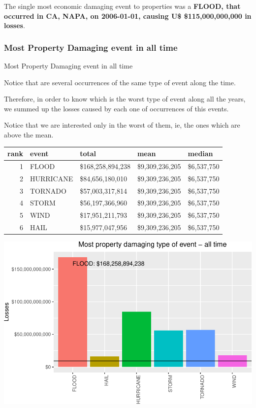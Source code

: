 \documentclass[]{article}
\begin{document}
The single most economic damaging event to properties was a
\textbf{FLOOD, that occurred in CA, NAPA, on 2006-01-01, causing U\$
\$115,000,000,000 in losses}.

\subsubsection{Most Property Damaging event in all
time}\label{most-property-damaging-event-in-all-time}

Most Property Damaging event in all time

Notice that are several occurrences of the same type of event along the
time.

Therefore, in order to know which is the worst type of event along all
the years, we summed up the losses caused by each one of occurrences of
this events.

Notice that we are interested only in the worst of them, ie, the ones
which are above the mean.

\begin{longtable}[]{@{}rllll@{}}
\toprule
rank & event & total & mean & median\tabularnewline
\midrule
\endhead
1 & FLOOD & \$168,258,894,238 & \$9,309,236,205 &
\$6,537,750\tabularnewline
2 & HURRICANE & \$84,656,180,010 & \$9,309,236,205 &
\$6,537,750\tabularnewline
3 & TORNADO & \$57,003,317,814 & \$9,309,236,205 &
\$6,537,750\tabularnewline
4 & STORM & \$56,197,366,960 & \$9,309,236,205 &
\$6,537,750\tabularnewline
5 & WIND & \$17,951,211,793 & \$9,309,236,205 &
\$6,537,750\tabularnewline
6 & HAIL & \$15,977,047,956 & \$9,309,236,205 &
\$6,537,750\tabularnewline
\bottomrule
\end{longtable}

\includegraphics{readme_files/figure-latex/prop-all-plot-1.pdf}
\end{document}
